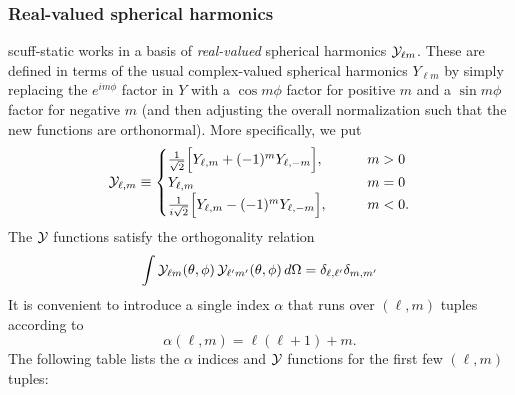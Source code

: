 \documentclass[letterpaper]{article}
\newcommand{\YY}{\mc Y}
\begin{document}
\subsubsection*{Real-valued spherical harmonics}
{\sc scuff-static} works in a basis of \textit{real-valued}
spherical harmonics $\YY_{\ell m}$. These are defined in 
terms of the usual complex-valued spherical harmonics 
$Y_{\ell m}$ by simply replacing the $e^{im\phi}$ factor 
in $Y$ with a $\cos m\phi$ factor for positive $m$
and a $\sin m\phi$ factor for negative $m$ 
(and then adjusting the overall normalization such that
the new functions are orthonormal).
More specifically, we put
$$ \YY_{\ell, m} \equiv
   \begin{cases}
     \frac{1}{\sqrt{2}}\Big[ Y_{\ell,m} + (-1)^{m} Y_{\ell,-m} \Big], \qquad 
     &m>0
     \\
     Y_{\ell,m} \qquad 
     &m=0
     \\
     \frac{1}{i\sqrt{2}}\Big[ Y_{\ell,m} - (-1)^m Y_{\ell,-m} \Big], \qquad
     &m<0.
   \end{cases}
$$
The $\YY$ functions satisfy the orthogonality relation
$$ \int \YY_{\ell m}(\theta, \phi)                 \,
        \YY_{\ell^\prime m^\prime}(\theta, \phi)   \,
        d\Omega
   =\delta_{\ell, \ell^\prime} \delta_{m,m^\prime}
$$
It is convenient to introduce a single index $\alpha$ 
that runs over $(\ell,m)$ tuples according to 
$$\alpha(\ell,m) = \ell(\ell + 1) + m. $$ 
The following table lists the $\alpha$ indices and 
$\YY$ functions for the first few $(\ell,m)$ tuples:
\renewcommand{\arraystretch}{2.0}
\end{document}
